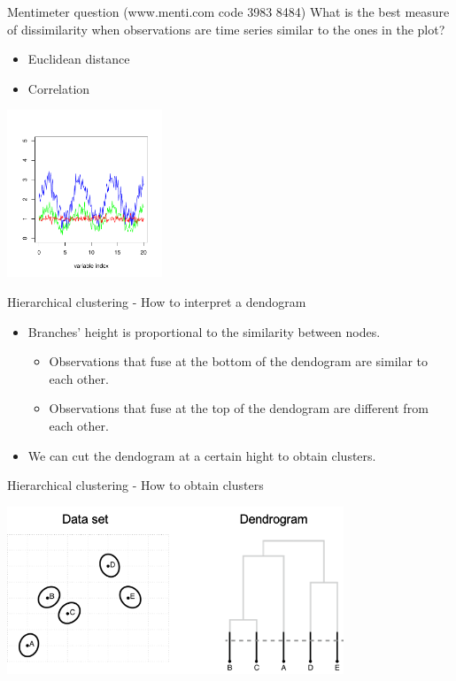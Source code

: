 \documentclass[notes]{beamer}          %
\begin{document}
\begin{frame}{Mentimeter question (www.menti.com code 3983 8484)}
What is the best measure of dissimilarity when observations are time series similar to the ones in the plot?
\begin{itemize}
\item Euclidean distance
\item Correlation
\end{itemize}
\begin{center}
\includegraphics[height=5cm]{../figures/week_6/question_metric_hierarchical_clustering.pdf}  
\end{center}
\end{frame}

\begin{frame}{Hierarchical clustering - How to interpret a dendogram}
\begin{itemize}
\item Branches' height is proportional to the similarity between nodes.
\begin{itemize}
\item Observations that fuse at the bottom of the dendogram are similar to each other.
\item Observations that fuse at the top of the dendogram are different from each other.
\end{itemize}
\item We can cut the dendogram at a certain hight to obtain clusters.
\end{itemize}
\end{frame}

\begin{frame}{Hierarchical clustering - How to obtain clusters}
\begin{center}
\includegraphics[height=5cm]{../figures/week_6/HierarchicalClustering_clusters_1.png}  
\end{center}
\end{frame}
\end{document}
